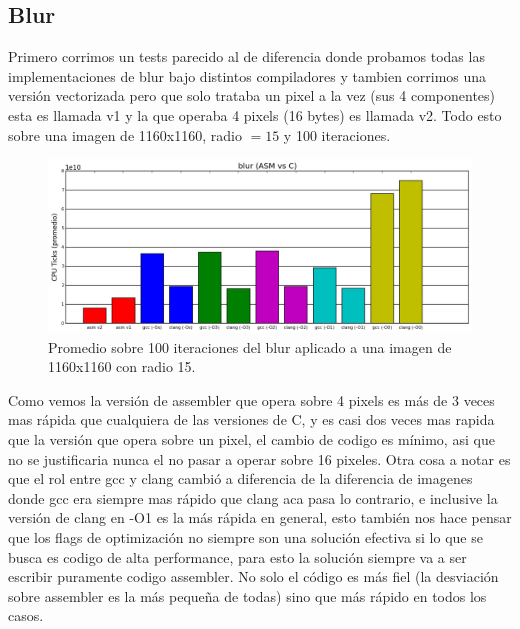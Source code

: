 \documentclass[a4paper]{article}
\begin{document}
\subsection{Blur}
Primero corrimos un tests parecido al de diferencia donde probamos todas las implementaciones de blur bajo distintos compiladores y tambien corrimos una versión vectorizada pero que solo trataba un pixel a la vez (sus 4 componentes) esta es llamada v1 y la que operaba 4 pixels (16 bytes) es llamada v2. Todo esto sobre una imagen de 1160x1160, radio $= 15$ y 100 iteraciones.

\begin{figure}[h]
	\includegraphics[scale=0.62]{imagenes/tests_blur_promedio.png}
	\caption{Promedio sobre 100 iteraciones del blur aplicado a una imagen de 1160x1160 con radio 15.}
\end{figure}

Como vemos la versión de assembler que opera sobre 4 pixels es más de 3 veces mas rápida que cualquiera de las versiones de C, y es casi dos veces mas rapida que la versión que opera sobre un pixel, el cambio de codigo es mínimo, asi que no se justificaria nunca el no pasar a operar sobre 16 pixeles. Otra cosa a notar es que el rol entre gcc y clang cambió a diferencia de la diferencia de imagenes donde gcc era siempre mas rápido que clang aca pasa lo contrario, e inclusive la versión de clang en -O1 es la más rápida en general, esto también nos hace pensar que los flags de optimización no siempre son una solución efectiva si lo que se busca es codigo de alta performance, para esto la solución siempre va a ser escribir puramente codigo assembler. No solo el código es más fiel (la desviación sobre assembler es la más pequeña de todas) sino que más rápido en todos los casos.
\newline
\end{document}

